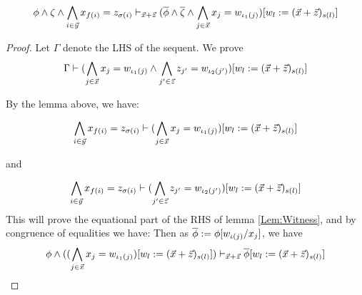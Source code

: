 \begin{lemma}\label{Lem:Witness}
  \begin{equation*}
    \phi\land \zeta\land \bigwedge_{i\in \vec{y}} x_{f(i)} = z_{\sigma(i)}\vdash_{\vec{x} + \vec{z}} (\overline{\phi}\land \overline{\zeta}\land\bigwedge_{j\in\vec{x}} x_j = w_{\iota_1(j)})[w_l:=(\vec{x}+\vec{z})_{s(l)}]
  \end{equation*}
\end{lemma}

\begin{proof}
  Let $\Gamma$ denote the LHS of the sequent. We prove
  \begin{equation*}
    \Gamma \vdash (\bigwedge_{j\in\vec{x}}x_j = w_{\iota_1(j)}\land \bigwedge_{j'\in\vec{z}}z_{j'}= w_{\iota_2(j')}) [w_l:=(\vec{x}+\vec{z})_{s(l)}]
  \end{equation*}

  By the lemma above, we have:

  \begin{equation*}
   \bigwedge_{i\in \vec{y}} x_{f(i)} = z_{\sigma(i)} \vdash
    (\bigwedge_{j\in\vec{x}}x_j = w_{\iota_1(j)}) [w_l:=(\vec{x}+\vec{z})_{s(l)}]
  \end{equation*}

  and

  \begin{equation*}
    \bigwedge_{i\in \vec{y}} x_{f(i)} = z_{\sigma(i)} \vdash
    (\bigwedge_{j'\in\vec{z}}z_{j'}= w_{\iota_2(j')}) [w_l:=(\vec{x}+\vec{z})_{s(l)}]
  \end{equation*}
  This will prove the equational part of the RHS of lemma \ref{Lem:Witness}, and by congruence of equalities we have:
  Then as $\overline{\phi} := \phi[w_{\iota(j)}/x_j]$, we have
  \begin{equation*}
    \phi\land ((\bigwedge_{j\in\vec{x}}x_j = w_{\iota_1(j)})[w_l:=(\vec{x}+\vec{z})_{s(l)}])  \vdash_{\vec{x} + \vec{z}} \overline{\phi} [w_l:=(\vec{x}+\vec{z})_{s(l)}]
  \end{equation*}







\end{proof}

